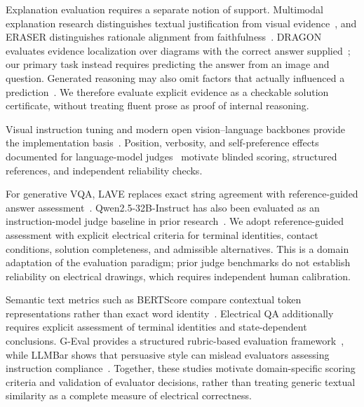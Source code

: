 Explanation evaluation requires a separate notion of support. Multimodal explanation research distinguishes textual justification from visual evidence~\cite{park2018explanations}, and ERASER distinguishes rationale alignment from faithfulness~\cite{deyoung2020eraser}. DRAGON evaluates evidence localization over diagrams with the correct answer supplied~\cite{iyengar2026dragon}; our primary task instead requires predicting the answer from an image and question. Generated reasoning may also omit factors that actually influenced a prediction~\cite{turpin2023unfaithful}. We therefore evaluate explicit evidence as a checkable solution certificate, without treating fluent prose as proof of internal reasoning.

Visual instruction tuning and modern open vision--language backbones provide the implementation basis~\cite{liu2023llava,bai2025qwen,li2024onevision}. Position, verbosity, and self-preference effects documented for language-model judges~\cite{zheng2023judge} motivate blinded scoring, structured references, and independent reliability checks.

For generative VQA, LAVE replaces exact string agreement with reference-guided answer assessment~\cite{manas2024lave}. Qwen2.5-32B-Instruct has also been evaluated as an instruction-model judge baseline in prior research~\cite{yu2025risejudge}. We adopt reference-guided assessment with explicit electrical criteria for terminal identities, contact conditions, solution completeness, and admissible alternatives. This is a domain adaptation of the evaluation paradigm; prior judge benchmarks do not establish reliability on electrical drawings, which requires independent human calibration.

Semantic text metrics such as BERTScore compare contextual token representations rather than exact word identity~\cite{zhang2020bertscore}. Electrical QA additionally requires explicit assessment of terminal identities and state-dependent conclusions. G-Eval provides a structured rubric-based evaluation framework~\cite{liu2023geval}, while LLMBar shows that persuasive style can mislead evaluators assessing instruction compliance~\cite{zeng2024llmbar}. Together, these studies motivate domain-specific scoring criteria and validation of evaluator decisions, rather than treating generic textual similarity as a complete measure of electrical correctness.
